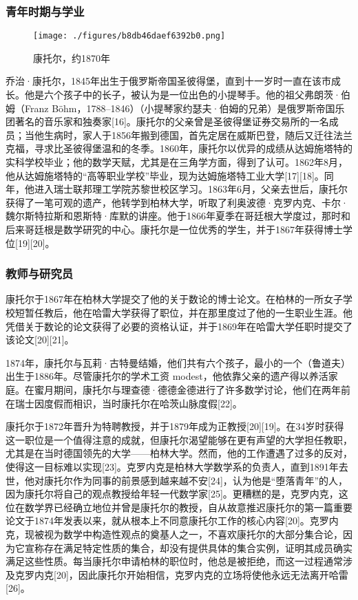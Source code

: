 \subsubsection{青年时期与学业}
\begin{figure}[ht]
\centering
\texttt{[image: ./figures/b8db46daef6392b0.png]}
\caption{康托尔，约1870年} \label{fig_Canto_2}
\end{figure}
乔治·康托尔，1845年出生于俄罗斯帝国圣彼得堡，直到十一岁时一直在该市成长。他是六个孩子中的长子，被认为是一位出色的小提琴手。他的祖父弗朗茨·伯姆（Franz Böhm，1788–1846）（小提琴家约瑟夫·伯姆的兄弟）是俄罗斯帝国乐团著名的音乐家和独奏家[16]。康托尔的父亲曾是圣彼得堡证券交易所的一名成员；当他生病时，家人于1856年搬到德国，首先定居在威斯巴登，随后又迁往法兰克福，寻求比圣彼得堡温和的冬季。1860年，康托尔以优异的成绩从达姆施塔特的实科学校毕业；他的数学天赋，尤其是在三角学方面，得到了认可。1862年8月，他从达姆施塔特的“高等职业学校”毕业，现为达姆施塔特工业大学[17][18]。同年，他进入瑞士联邦理工学院苏黎世校区学习。1863年6月，父亲去世后，康托尔获得了一笔可观的遗产，他转学到柏林大学，听取了利奥波德·克罗内克、卡尔·魏尔斯特拉斯和恩斯特·库默的讲座。他于1866年夏季在哥廷根大学度过，那时和后来哥廷根是数学研究的中心。康托尔是一位优秀的学生，并于1867年获得博士学位[19][20]。
\subsubsection{教师与研究员}  
康托尔于1867年在柏林大学提交了他的关于数论的博士论文。在柏林的一所女子学校短暂任教后，他在哈雷大学获得了职位，并在那里度过了他的一生职业生涯。他凭借关于数论的论文获得了必要的资格认证，并于1869年在哈雷大学任职时提交了该论文[20][21]。

1874年，康托尔与瓦莉·古特曼结婚，他们共有六个孩子，最小的一个（鲁道夫）出生于1886年。尽管康托尔的学术工资 modest，他依靠父亲的遗产得以养活家庭。在蜜月期间，康托尔与理查德·德德金德进行了许多数学讨论，他们在两年前在瑞士因度假而相识，当时康托尔在哈茨山脉度假[22]。

康托尔于1872年晋升为特聘教授，并于1879年成为正教授[20][19]。在34岁时获得这一职位是一个值得注意的成就，但康托尔渴望能够在更有声望的大学担任教职，尤其是在当时德国领先的大学——柏林大学。然而，他的工作遭遇了过多的反对，使得这一目标难以实现[23]。克罗内克是柏林大学数学系的负责人，直到1891年去世，他对康托尔作为同事的前景感到越来越不安[24]，认为他是“堕落青年”的人，因为康托尔将自己的观点教授给年轻一代数学家[25]。更糟糕的是，克罗内克，这位在数学界已经确立地位并曾是康托尔的教授，自从故意推迟康托尔的第一篇重要论文于1874年发表以来，就从根本上不同意康托尔工作的核心内容[20]。克罗内克，现被视为数学中构造性观点的奠基人之一，不喜欢康托尔的大部分集合论，因为它宣称存在满足特定性质的集合，却没有提供具体的集合实例，证明其成员确实满足这些性质。每当康托尔申请柏林的职位时，他总是被拒绝，而这一过程通常涉及克罗内克[20]，因此康托尔开始相信，克罗内克的立场将使他永远无法离开哈雷[26]。

